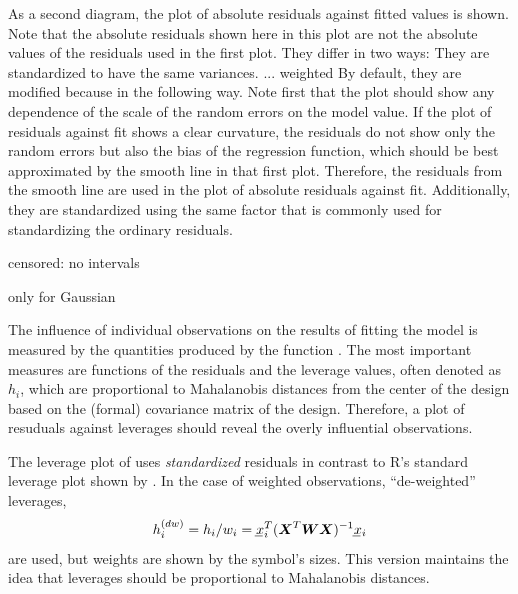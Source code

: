 \documentclass[11pt]{article}\usepackage[]{graphicx}\usepackage[]{color}
\begin{document}

As a second diagram, the plot of absolute residuals against fitted values
is shown.
Note that the absolute residuals shown here in this plot are not the 
absolute values of the residuals used in the first plot. 
They differ in two ways:
\Itm
They are standardized to have the same variances.
... weighted
\Itm
By default, they are modified because in the following way.
Note first that the plot should show any dependence of the scale of the
random errors on the model value.
If the plot of residuals against fit shows a clear curvature, the
residuals do not show only the random errors but also the bias of the
regression function, which should be best approximated by the smooth line
in that first plot. Therefore, the residuals from the smooth line are 
used in the plot of absolute residuals against fit.
Additionally, they are standardized using the same factor that is commonly
used for standardizing the ordinary residuals.

censored: no intervals

only for Gaussian

The influence of individual observations on the results of fitting the model
is measured by the quantities produced by the function .
The most important measures are functions of the residuals and the 
leverage values, often denoted as $h_i$, which are proportional to
Mahalanobis distances from the center of the design based on the 
(formal) covariance matrix of the design.
Therefore, a plot of resuduals against leverages should reveal the overly
influential observations.

The leverage plot of  uses \emph{standardized} residuals
in contrast to R's standard leverage plot shown by .
In the case of weighted observations, ``de-weighted'' leverages,
\[
  h_i\sups{dw} = h_i/w_i = \vc x_i\tr (\mx X\tr \mx W \mx X)\inv \vc x_i
\]
are used, but weights are shown by the symbol's sizes.
This version maintains the idea that leverages should be proportional to 
Mahalanobis distances.
\end{document}
